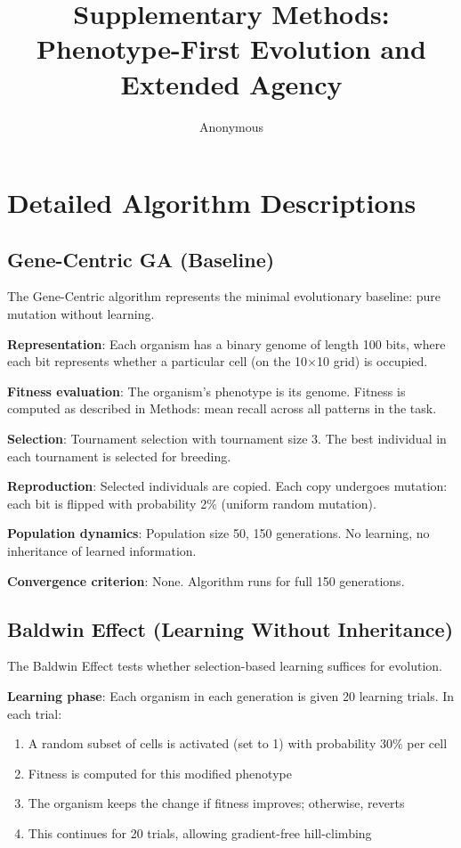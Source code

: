 \documentclass[twocolumn]{article}
\title{Supplementary Methods: Phenotype-First Evolution and Extended Agency}
\author{Anonymous}
\date{}
\begin{document}
\maketitle


\section*{Detailed Algorithm Descriptions}

\subsection*{Gene-Centric GA (Baseline)}

The Gene-Centric algorithm represents the minimal evolutionary baseline: pure mutation without learning.

\textbf{Representation}: Each organism has a binary genome of length 100 bits, where each bit represents whether a particular cell (on the 10$\times$10 grid) is occupied.

\textbf{Fitness evaluation}: The organism's phenotype is its genome. Fitness is computed as described in Methods: mean recall across all patterns in the task.

\textbf{Selection}: Tournament selection with tournament size 3. The best individual in each tournament is selected for breeding.

\textbf{Reproduction}: Selected individuals are copied. Each copy undergoes mutation: each bit is flipped with probability 2\% (uniform random mutation).

\textbf{Population dynamics}: Population size 50, 150 generations. No learning, no inheritance of learned information.

\textbf{Convergence criterion}: None. Algorithm runs for full 150 generations.

\subsection*{Baldwin Effect (Learning Without Inheritance)}

The Baldwin Effect tests whether selection-based learning suffices for evolution.

\textbf{Learning phase}: Each organism in each generation is given 20 learning trials. In each trial:
\begin{enumerate}
\item A random subset of cells is activated (set to 1) with probability 30\% per cell
\item Fitness is computed for this modified phenotype
\item The organism keeps the change if fitness improves; otherwise, reverts
\item This continues for 20 trials, allowing gradient-free hill-climbing
\end{enumerate}
\end{document}
